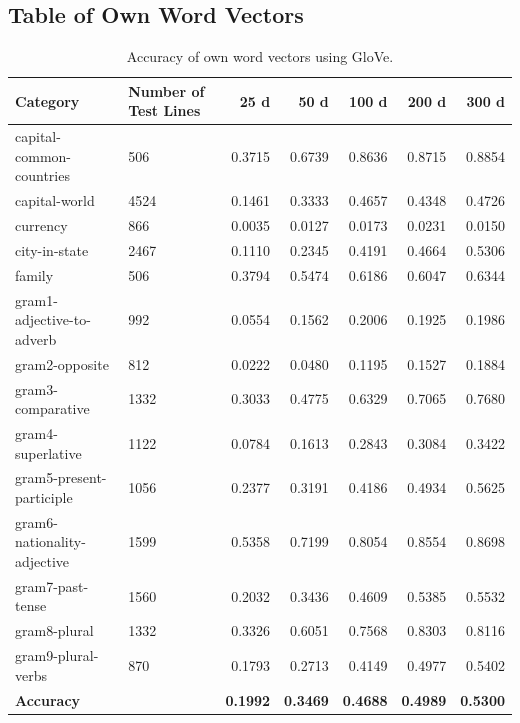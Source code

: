 \newpage
\subsection{Table of Own Word Vectors}

\begin{table}[!h]
\begin{tabular}{l|R{2.5cm}|r|r|r|r|r}
\hline
\textbf{Category}	             & \textbf{Number of Test Lines}	& \textbf{25 d}	  & \textbf{50 d}	  & \textbf{100 d} 	& \textbf{200 d}	  & \textbf{300 d} \\
\hline\hline
capital-common-countries	     & 506	                          & 0.3715	        & 0.6739 	        & 0.8636	& 0.8715	& 0.8854\\ \hline
capital-world	                 & 4524	                          & 0.1461	        & 0.3333 	        & 0.4657	& 0.4348	& 0.4726\\ \hline
currency	                     & 866	                          & 0.0035	        & 0.0127 	        & 0.0173	& 0.0231	& 0.0150\\ \hline
city-in-state	                 & 2467	                          & 0.1110	        & 0.2345 	        & 0.4191	& 0.4664	& 0.5306\\ \hline
family	                       & 506	                          & 0.3794	        & 0.5474 	        & 0.6186	& 0.6047	& 0.6344\\ \hline
gram1-adjective-to-adverb	     & 992	                          & 0.0554	        & 0.1562 	        & 0.2006	& 0.1925	& 0.1986\\ \hline
gram2-opposite	               & 812	                          & 0.0222	        & 0.0480 	        & 0.1195	& 0.1527	& 0.1884\\ \hline
gram3-comparative	             & 1332	                          & 0.3033	        & 0.4775 	        & 0.6329	& 0.7065	& 0.7680\\ \hline
gram4-superlative	             & 1122	                          & 0.0784	        & 0.1613 	        & 0.2843	& 0.3084	& 0.3422\\ \hline
gram5-present-participle	     & 1056	                          & 0.2377	        & 0.3191 	        & 0.4186	& 0.4934	& 0.5625\\ \hline
gram6-nationality-adjective	   & 1599	                          & 0.5358	        & 0.7199 	        & 0.8054	& 0.8554	& 0.8698\\ \hline
gram7-past-tense	             & 1560	                          & 0.2032	        & 0.3436 	        & 0.4609	& 0.5385	& 0.5532\\ \hline
gram8-plural	                 & 1332	                          & 0.3326	        & 0.6051 	        & 0.7568	& 0.8303	& 0.8116\\ \hline
gram9-plural-verbs	           & 870	                          & 0.1793	        & 0.2713 	        & 0.4149	& 0.4977	& 0.5402\\ \hline
\textbf{Accuracy} & & \textbf{0.1992} & \textbf{0.3469} & \textbf{0.4688} & \textbf{0.4989}	& \textbf{0.5300}\\ \hline
\end{tabular}
\caption{Accuracy of own word vectors using GloVe.}
\end{table}

